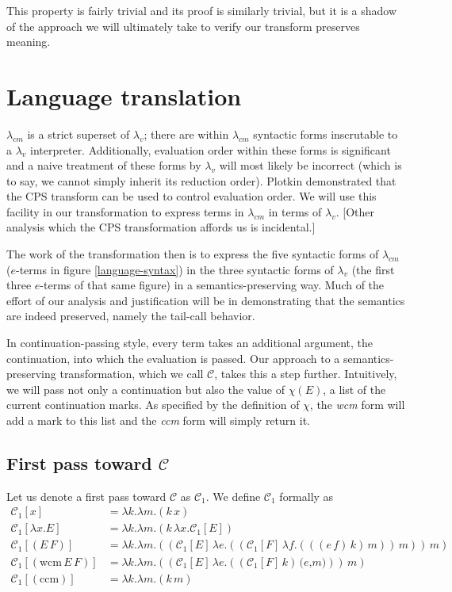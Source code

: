 \documentclass[ms,electronic,twosidetoc,letterpaper,chaptercenter,parttop]{byumsphd}
\begin{document}
This property is fairly trivial and its proof is similarly trivial, but it is a shadow of 
the approach we will ultimately take to verify our transform preserves meaning.

\section{Language translation}

$\lambda_{cm}$ is a strict superset of $\lambda_{v}$; there are within $\lambda_{cm}$
syntactic forms inscrutable to a $\lambda_{v}$ interpreter. Additionally, evaluation order
within these forms is significant and a naive treatment of these forms by $\lambda_{v}$
will most likely be incorrect (which is to say, we cannot simply inherit its reduction
order). Plotkin \cite{plotkin1975call} demonstrated that the CPS transform can be used to
control evaluation order. We will use this facility in our transformation to express terms
in $\lambda_{cm}$ in terms of $\lambda_{v}$. [Other analysis which the CPS transformation
affords us \cite{appel2007compiling} is incidental.]

The work of the transformation then is to express the five syntactic forms of
$\lambda_{cm}$ ($e$-terms in figure \ref{language-syntax}) in the three syntactic forms of
$\lambda_{v}$ (the first three $e$-terms of that same figure) in a semantics-preserving
way. Much of the effort of our analysis and justification will be in demonstrating that
the semantics are indeed preserved, namely the tail-call behavior.

In continuation-passing style, every term takes an additional argument, the continuation,
into which the evaluation is passed. Our approach to a semantics-preserving
transformation, which we call $\mathcal{C}$, takes this a step further. Intuitively, we
will pass not only a continuation but also the value of $\chi(E)$, a list of the current 
continuation marks. As specified by the definition of $\chi$, the \emph{wcm} form will 
add a mark to this list and the \emph{ccm} form will simply return it.

\subsection{First pass toward $\mathcal{C}$}

Let us denote a first pass toward $\mathcal{C}$ as $\mathcal{C}_{1}$. We define 
$\mathcal{C}_{1}$ formally as 
\begin{align*}
\mathcal{C}_{1}[x]                      &= \lambda k.\lambda m.(k\,x)\\
\mathcal{C}_{1}[\lambda x.E]            &= \lambda k.\lambda m.(k\,\lambda x.\mathcal{C}_{1}[E])\\
\mathcal{C}_{1}[(E\,F)]                 &= \lambda k.\lambda m.((\mathcal{C}_{1}[E]\,\lambda e.((\mathcal{C}_{1}[F]\,\lambda f.(((e\,f)\,k)\,m))\,m))\,m)\\
\mathcal{C}_{1}[(\mathrm{wcm}\,E\,F)]   &= \lambda k.\lambda m.((\mathcal{C}_{1}[E]\,\lambda e.((\mathcal{C}_{1}[F]\,k)\,\textbf{(}e\textbf{,}m\textbf{)}))\,m)\\
\mathcal{C}_{1}[(\mathrm{ccm})]         &= \lambda k.\lambda m.(k\,m)
\end{align*}
\end{document}
